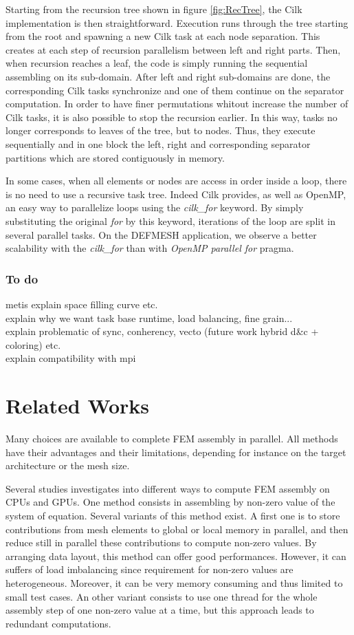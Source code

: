 \documentclass{IOS-Book-Article}
\begin{document}
Starting from the recursion tree shown in figure \ref{fig:RecTree}, the Cilk implementation is then straightforward.
Execution runs through the tree starting from the root and spawning a new Cilk task at each node separation.
This creates at each step of recursion parallelism between left and right parts.
Then, when recursion reaches a leaf, the code is simply running the sequential assembling on its sub-domain.
After left and right sub-domains are done, the corresponding Cilk tasks synchronize and one of them continue on the separator computation.
In order to have finer permutations whitout increase the number of Cilk tasks, it is also possible to stop the recursion earlier.
In this way, tasks no longer corresponds to leaves of the tree, but to nodes.
Thus, they execute sequentially and in one block the left, right and corresponding separator partitions which are stored contiguously in memory.

In some cases, when all elements or nodes are access in order inside a loop, there is no need to use a recursive task tree.
Indeed Cilk provides, as well as OpenMP, an easy way to parallelize loops using the \emph{cilk\_for} keyword.
By simply substituting the original \emph{for} by this keyword, iterations of the loop are split in several parallel tasks.
On the DEFMESH application, we observe a better scalability with the \emph{cilk\_for} than with \emph{OpenMP parallel for} pragma.

\subsubsection{To do}
metis explain space filling curve etc.\\
explain why we want task base runtime, load balancing, fine grain...\\
explain problematic of sync, conherency, vecto (future work hybrid d\&c + coloring) etc.\\
explain compatibility with mpi\\

\section{Related Works}
Many choices are available to complete FEM assembly in parallel.
All methods have their advantages and their limitations, depending for instance on the target architecture or the mesh size.

Several studies \cite{Stanford,CPUGPUasm} investigates into different ways to compute FEM assembly on CPUs and GPUs.
One method consists in assembling by non-zero value of the system of equation. Several variants of this method exist.
A first one is to store contributions from mesh elements to global or local memory in parallel, and then reduce still in parallel these contributions to compute non-zero values.
By arranging data layout, this method can offer good performances. However, it can suffers of load imbalancing since requirement for non-zero values are heterogeneous.
Moreover, it can be very memory consuming and thus limited to small test cases.
An other variant consists to use one thread for the whole assembly step of one non-zero value at a time, but this approach leads to redundant computations.
\end{document}
